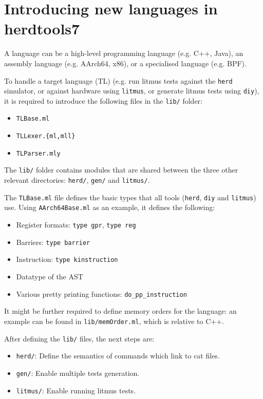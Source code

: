 \section{Introducing new languages in herdtools7}

A language can be a high-level programming language (e.g. C++, Java), an
assembly language (e.g. AArch64, x86), or a specialised language (e.g. BPF).

To handle a target language (TL) (e.g. run litmus tests against the
\texttt{herd} simulator, or against hardware using \texttt{litmus}, or generate
litmus tests using \texttt{diy}), it is required to introduce the following
files in the \texttt{lib/} folder:

\begin{itemize}
\item \texttt{TLBase.ml}
\item \texttt{TLLexer.\{ml,mll\}}
\item \texttt{TLParser.mly}
\end{itemize}

The \texttt{lib/} folder contains modules that are shared between the three
other relevant directories: \texttt{herd/}, \texttt{gen/} and \texttt{litmus/}.

The \texttt{TLBase.ml} file defines the basic types that all tools
(\texttt{herd}, \texttt{diy} and \texttt{litmus}) use. Using
\texttt{AArch64Base.ml} as an example, it defines the following:

\begin{itemize}
\item Register formats: \texttt{type gpr}, \texttt{type reg}
\item Barriers: \texttt{type barrier}
\item Instruction: \texttt{type kinstruction}
\item Datatype of the AST
\item Various pretty printing functions: \texttt{do_pp_instruction}
\end{itemize}

It might be further required to define memory orders for the language: an
example can be found in \texttt{lib/memOrder.ml}, which is relative to C++.

After defining the \texttt{lib/} files, the next steps are:

\begin{itemize}
\item \texttt{herd/}: Define the semantics of commands which link to cat files.
\item \texttt{gen/}: Enable multiple tests generation.
\item \texttt{litmus/}: Enable running litmus tests.
\end{itemize}

